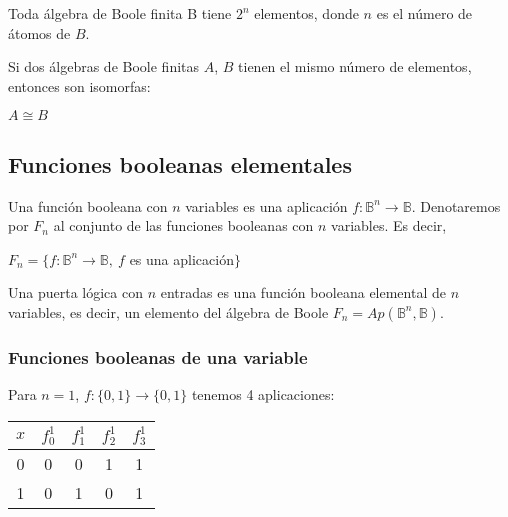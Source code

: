 \begin{ncor}
    Toda  álgebra de Boole finita B tiene $2^n$ elementos, donde $n$ es el número de átomos de $B$.
\end{ncor}

\begin{nth}
    Si dos álgebras de Boole finitas $A$, $B$ tienen el mismo número de elementos, entonces son isomorfas:
    \begin{center}
        $A \cong B$
    \end{center}
\end{nth}

\subsection{Funciones booleanas elementales}
\begin{ndef}
    Una función booleana con $n$ variables es una aplicación $f: \mathbb{B}^n \rightarrow \mathbb{B}$.
    Denotaremos por $F_n$ al conjunto de las funciones booleanas con $n$ variables. Es decir,
    \begin{center}
        $F_n = \{f:\mathbb{B}^n \rightarrow \mathbb{B}, \ f$ es una aplicación$\}$
    \end{center}
\end{ndef}
\begin{ndef}
    Una puerta lógica con $n$ entradas es una función booleana elemental de $n$ variables, es decir, un elemento del álgebra de Boole
    $F_n = Ap(\mathbb{B}^n, \mathbb{B})$.
\end{ndef}

\subsubsection{Funciones booleanas de una variable}
Para $n=1$, $f: \{0,1\} \rightarrow \{0,1\}$ tenemos 4 aplicaciones:
\begin{center}
    \begin{tabular}{ |c||c|c|c|c|  }
        \hline
        $x$ & $f_0^1$ & $f_1^1$ & $f_2^1$ & $f_3^1$ \\
        \hline
        0   & 0       & 0       & 1       & 1       \\
        1   & 0       & 1       & 0       & 1       \\
        \hline
    \end{tabular}
\end{center}

